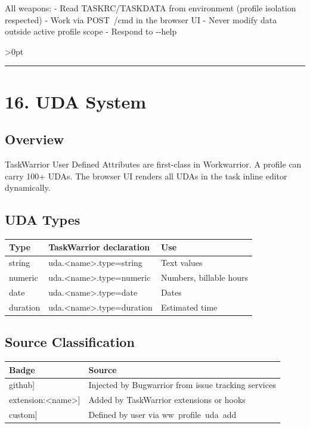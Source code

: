 \documentclass[11pt, a4paper, DIV=14]{scrartcl}
\renewcommand{\texttt}[1]{{\ttfamily\fontsize{8.5}{10.5}\selectfont\color{BabbNavy}#1}}
\newcounter{none}
\let\origRule\rule
\renewcommand{\rule}[3][0pt]{%
  \ifnum\dimexpr#3\relax>0pt
    \par\vspace{2pt}\noindent{\color{BabbBorder}\origRule[#1]{#2}{#3}}\par\vspace{2pt}%
  \else
    \origRule[#1]{#2}{#3}%
  \fi
}
\begin{document}
All weapons: - Read TASKRC/TASKDATA from environment (profile isolation
respected) - Work via \texttt{POST\ /cmd} in the browser UI - Never
modify data outside active profile scope - Respond to \texttt{-\/-help}

\begin{center}\rule{0.5\linewidth}{0.5pt}\end{center}

\section{16. UDA System}\label{uda-system}

\subsection{Overview}\label{overview-3}

TaskWarrior User Defined Attributes are first-class in Workwarrior. A
profile can carry 100+ UDAs. The browser UI renders all UDAs in the task
inline editor dynamically.

\subsection{UDA Types}\label{uda-types}

{\def\LTcaptype{none} %
\begin{longtable}[]{@{}lll@{}}
\toprule\noalign{}
Type & TaskWarrior declaration & Use \\
\midrule\noalign{}
\endhead
\bottomrule\noalign{}
\endlastfoot
string & \texttt{uda.\textless{}name\textgreater{}.type=string} & Text
values \\
numeric & \texttt{uda.\textless{}name\textgreater{}.type=numeric} &
Numbers, billable hours \\
date & \texttt{uda.\textless{}name\textgreater{}.type=date} & Dates \\
duration & \texttt{uda.\textless{}name\textgreater{}.type=duration} &
Estimated time \\
\end{longtable}
}

\subsection{Source Classification}\label{source-classification}

{\def\LTcaptype{none} %
\begin{longtable}[]{@{}ll@{}}
\toprule\noalign{}
Badge & Source \\
\midrule\noalign{}
\endhead
\bottomrule\noalign{}
\endlastfoot
\texttt{{[}github{]}} & Injected by Bugwarrior from issue tracking
services \\
\texttt{{[}extension:\textless{}name\textgreater{}{]}} & Added by
TaskWarrior extensions or hooks \\
\texttt{{[}custom{]}} & Defined by user via
\texttt{ww\ profile\ uda\ add} \\
\end{longtable}
}
\end{document}
